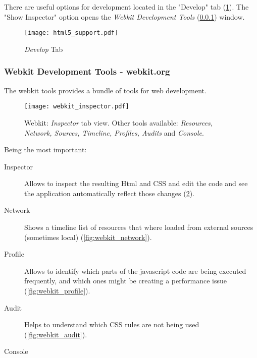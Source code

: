       

      There are useful options for development located in the "Develop" tab (\ref{fig:html5_support}).
      The "Show Inspector" option opens the \emph{Webkit Development Tools} (\ref{ssub:webkit_tools}) window.

      \begin{figure}[tb]
        \begin{center}
          \texttt{[image: html5\_support.pdf]}
        \end{center}
        \caption{\emph{Develop} Tab}
        \label{fig:html5_support}
      \end{figure}
    
    \subsubsection{Webkit Development Tools - webkit.org} %
    \label{ssub:webkit_tools}

      The webkit tools provides a bundle of tools for web development.

      \begin{figure}
        \begin{center}
          \texttt{[image: webkit\_inspector.pdf]}
        \end{center}
        \caption{Webkit: \emph{Inspector} tab view. Other tools available: \emph{Resources, Network, Sources, Timeline, Profiles, Audits} and \emph{Console}.}

        \label{fig:webkit_inspector}
      \end{figure}

      Being the most important:

      \begin{description}
        \item[Inspector] Allows to inspect the resulting Html and CSS and edit the code and see the application automatically reflect those changes (\ref{fig:webkit_inspector}).
        \item[Network] Shows a timeline list of resources that where loaded from external sources (sometimes local) (\ref{fig:webkit_network}).
        \item[Profile] Allows to identify which parts of the javascript code are being executed frequently, and which ones might be creating a performance issue (\ref{fig:webkit_profile}).
        \item[Audit] Helps to understand which CSS rules are not being used (\ref{fig:webkit_audit}).
        \item[Console] Javascript interpreter that also works as the log output for the application (\ref{fig:webkit_console}).

      \end{description}

